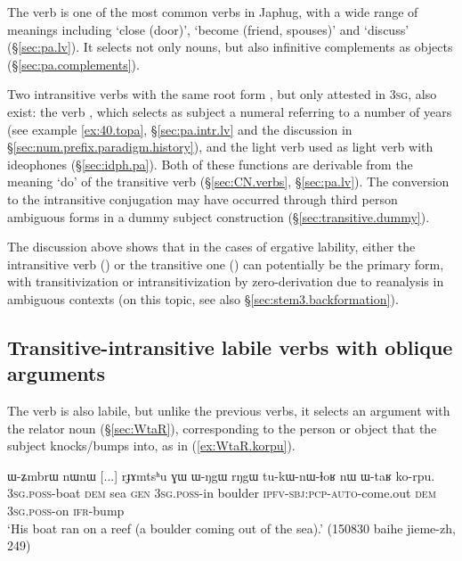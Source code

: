 The verb  is one of the most common verbs in Japhug, with a wide range of meanings including `close (door)', `become (friend, spouses)' and `discuss' (§\ref{sec:pa.lv}). It selects not only nouns, but also infinitive complements as objects (§\ref{sec:pa.complements}).
 
Two intransitive verbs with the same root form , but only attested in \textsc{3sg}, also exist: the verb , which selects as subject a numeral referring to a number of years (see example \ref{ex:40.topa}, §\ref{sec:pa.intr.lv} and the discussion in §\ref{sec:num.prefix.paradigm.history}), and the light verb  used as light verb with ideophones (§\ref{sec:idph.pa}). Both of these functions are derivable from the meaning `do' of the transitive verb (§\ref{sec:CN.verbs}, §\ref{sec:pa.lv}). The conversion to the intransitive conjugation may have occurred through third person ambiguous forms in a dummy subject construction (§\ref{sec:transitive.dummy}).

The discussion above shows that in the cases of ergative lability, either the intransitive verb () or the transitive one () can potentially be the primary form, with transitivization or intransitivization by zero-derivation due to reanalysis in ambiguous contexts (on this topic, see also §\ref{sec:stem3.backformation}).

\subsection{Transitive-intransitive labile verbs with oblique arguments} \label{sec:goal.labile}
The verb  is also labile, but unlike the previous verbs, it selects an argument with the relator noun  (§\ref{sec:WtaR}), corresponding to the person or object that the subject knocks/bumps into, as in (\ref{ex:WtaR.korpu}).
 
 \begin{exe}
\ex \label{ex:WtaR.korpu}
\gll   ɯ-ʑmbrɯ nɯnɯ [...] rɟɤmtsʰu ɣɯ ɯ-ŋgɯ rŋgɯ tu-kɯ-nɯ-ɬoʁ nɯ ɯ-taʁ ko-rpu. \\ 
\textsc{3sg}.\textsc{poss}-boat \textsc{dem} { } sea \textsc{gen} \textsc{3sg}.\textsc{poss}-in boulder \textsc{ipfv}-\textsc{sbj}:\textsc{pcp}-\textsc{auto}-come.out \textsc{dem} \textsc{3sg}.\textsc{poss}-on \textsc{ifr}-bump \\
\glt  `His boat ran on a reef (a boulder coming out of the sea).' (150830 baihe jieme-zh, 249)
\end{exe}


